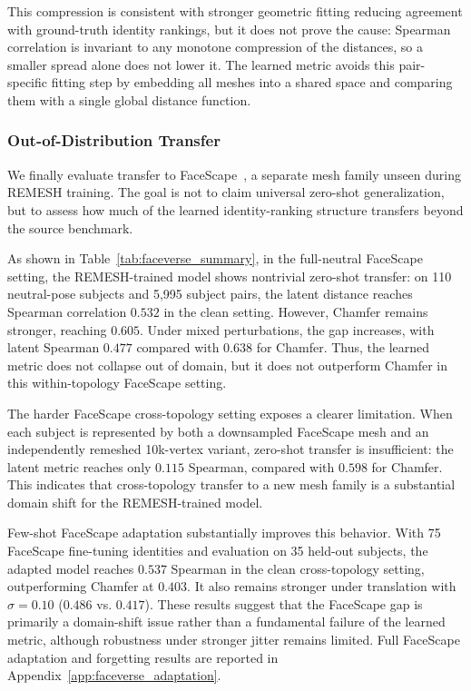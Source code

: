 This compression is consistent with stronger geometric fitting reducing agreement with ground-truth identity rankings, but it does not prove the cause: Spearman correlation is invariant to any monotone compression of the distances, so a smaller spread alone does not lower it. The learned metric avoids this pair-specific fitting step by embedding all meshes into a shared space and comparing them with a single global distance function.

\subsubsection{Out-of-Distribution Transfer}
\label{sec:ood_transfer}
We finally evaluate transfer to FaceScape~\cite{facescape}, a separate mesh family unseen during REMESH training. The goal is not to claim universal zero-shot generalization, but to assess how much of the learned identity-ranking structure transfers beyond the source benchmark.

As shown in Table~\ref{tab:faceverse_summary}, in the full-neutral FaceScape setting, the REMESH-trained model shows nontrivial zero-shot transfer: on 110 neutral-pose subjects and 5,995 subject pairs, the latent distance reaches Spearman correlation $0.532$ in the clean setting. However, Chamfer remains stronger, reaching $0.605$. Under mixed perturbations, the gap increases, with latent Spearman $0.477$ compared with $0.638$ for Chamfer. Thus, the learned metric does not collapse out of domain, but it does not outperform Chamfer in this within-topology FaceScape setting.

The harder FaceScape cross-topology setting exposes a clearer limitation. When each subject is represented by both a downsampled FaceScape mesh and an independently remeshed 10k-vertex variant, zero-shot transfer is insufficient: the latent metric reaches only $0.115$ Spearman, compared with $0.598$ for Chamfer. This indicates that cross-topology transfer to a new mesh family is a substantial domain shift for the REMESH-trained model.

Few-shot FaceScape adaptation substantially improves this behavior. With 75 FaceScape fine-tuning identities and evaluation on 35 held-out subjects, the adapted model reaches $0.537$ Spearman in the clean cross-topology setting, outperforming Chamfer at $0.403$. It also remains stronger under translation with $\sigma=0.10$ ($0.486$ vs. $0.417$). These results suggest that the FaceScape gap is primarily a domain-shift issue rather than a fundamental failure of the learned metric, although robustness under stronger jitter remains limited. Full FaceScape adaptation and forgetting results are reported in
Appendix~\ref{app:faceverse_adaptation}.


